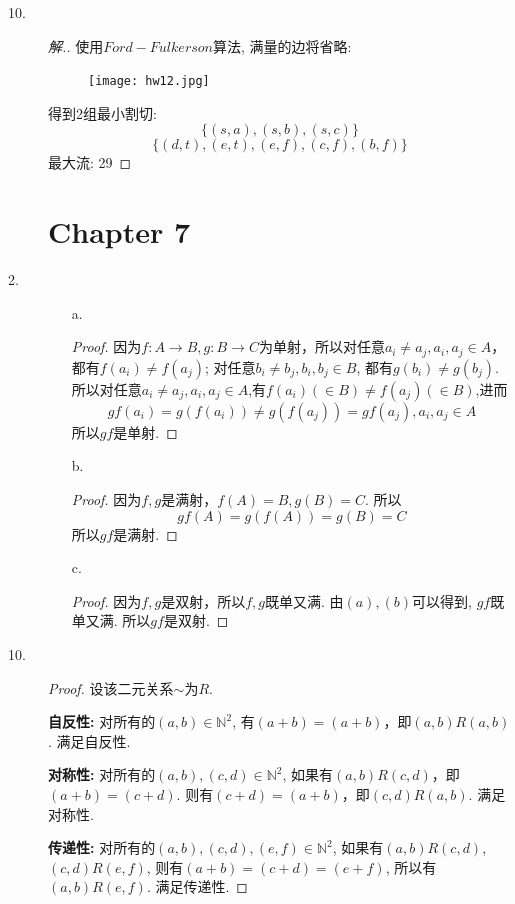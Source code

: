 \documentclass[UTF8, onecolumn, a4paper]{article}
\begin{document}
\begin{description}
\item[10.]
\begin{proof}[解.]使用$Ford-Fulkerson$算法, 满量的边将省略:\\
\begin{figure}[htb]
	\centering
	\texttt{[image: hw12.jpg]}
	\caption{}
	\label{fig:hw12}
\end{figure}
得到2组最小割切:$$\{(s,a), (s, b), (s, c)\}$$
$$\{(d, t), (e, t), (e, f), (c, f), (b, f)\}$$
最大流: 29
\end{proof}

\section*{Chapter 7}
\item[2.]
\begin{enumerate}
	\item[a.]
	\begin{proof}
		因为$f: A\rightarrow B, g: B\rightarrow C$为单射，所以对任意$a_i\neq a_j, a_i, a_j\in A$， 都有$f(a_i)\neq f(a_j)$; 对任意$b_i\neq b_j, b_i, b_j\in B$, 都有$g(b_i)\neq g(b_j)$. 所以对任意$a_i\neq a_j, a_i, a_j\in A$,有$f(a_i)(\in B)\neq f(a_j)(\in B)$,进而 $$gf(a_i) = g(f(a_i)) \neq g(f(a_j)) = gf(a_j), a_i,a_j\in A$$
		所以$gf$是单射.
	\end{proof}
	
	\item[b.] 
	\begin{proof}
		因为$f, g$是满射，$f(A) = B, g(B) = C$. 所以$$ gf(A) = g(f(A)) = g(B) = C $$
		所以$gf$是满射.
	\end{proof}
	
	\item[c.]
	\begin{proof}
		因为$f, g$是双射，所以$f, g$既单又满. 由$(a), (b)$可以得到, $gf$既单又满. 所以$gf$是双射.
	\end{proof}
\end{enumerate}


\item[10.]
\begin{proof}
	设该二元关系$\sim$为$R$.
	
	\textbf{自反性:} 对所有的$(a, b)\in \mathbb{N}^2$, 有$(a+b) = (a+b)$，即$(a, b) R (a, b)$. 满足自反性.
	
	\textbf{对称性:} 对所有的$(a, b), (c, d)\in \mathbb{N}^2$, 如果有$(a, b)R(c, d)$，即$(a+b)=(c+d)$. 则有$(c+d) = (a+b)$，即$(c, d)R(a, b)$. 满足对称性.
	
	\textbf{传递性:} 对所有的$(a,b), (c, d), (e, f)\in \mathbb{N}^2$, 如果有$(a, b) R(c, d)$, $(c,d)R(e, f)$, 则有$(a+b) = (c+d) = (e+f)$, 所以有$(a, b)R(e, f)$. 满足传递性.
	

\end{proof}
\end{description}
\end{document}
